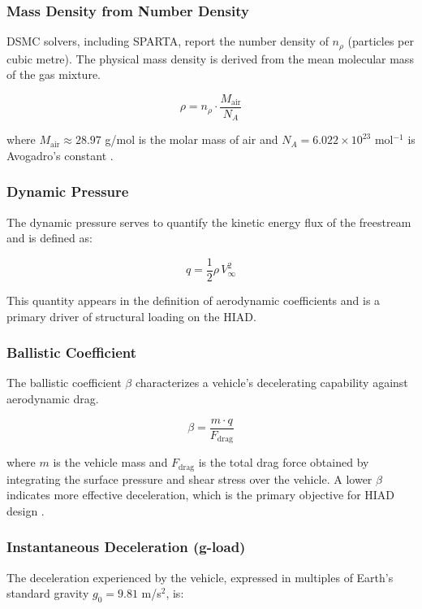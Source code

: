 \subsubsection*{Mass Density from Number Density}
DSMC solvers, including SPARTA, report the number density of $n_{\rho}$ (particles per cubic metre). The physical mass density is derived from the mean molecular mass of the gas mixture.

\begin{equation}
    \rho = n_{\rho} \cdot \frac{M_{\text{air}}}{N_A}
    \label{eq:mass_density}
\end{equation}

\noindent where $M_{\text{air}} \approx 28.97$ g/mol is the molar mass of air and $N_A = 6.022 \times 10^{23}$ mol$^{-1}$ is Avogadro's constant \cite{AndersonHypersonic}.

\subsubsection*{Dynamic Pressure}
The dynamic pressure serves to quantify the kinetic energy flux of the freestream and is defined as:

\begin{equation}
    q = \frac{1}{2} \rho \, V_{\infty}^{2}
    \label{eq:dynamic_pressure}
\end{equation}

\noindent This quantity appears in the definition of aerodynamic coefficients and is a primary driver of structural loading on the HIAD.

\subsubsection*{Ballistic Coefficient}
The ballistic coefficient $\beta$ characterizes a vehicle's decelerating capability against aerodynamic drag.

\begin{equation}
    \beta = \frac{m \cdot q}{F_{\text{drag}}}
    \label{eq:ballistic_coefficient}
\end{equation}

\noindent where $m$ is the vehicle mass and $F_{\text{drag}}$ is the total drag force obtained by integrating the surface pressure and shear stress over the vehicle. A lower $\beta$ indicates more effective deceleration, which is the primary objective for HIAD design \cite{AndersonHypersonic}.

\subsubsection*{Instantaneous Deceleration (g-load)}
The deceleration experienced by the vehicle, expressed in multiples of Earth's standard gravity $g_0 = 9.81$ m/s$^{2}$, is:

